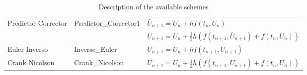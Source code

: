 \begin{table}[H]
\begin{center}
\begin{spacing}{1.5}
\begin{tabular}{| l | l | l |}
				Predictor Corrector & Predictor\_Corrector1  & $ \bar{U}_{n+1}=U_{n}+hf(t_{n},U_{n}) $ \\
				& & $ U_{n+1}=U_{n}+\frac{1}{2}h(f(t_{n+1},\bar{U}_{n+1})+f(t_{n},U_{n} )) $\\ \hline
				
				Euler Inverso & Inverse\_Euler & $ U_{n+1}=U_{n}+hf(t_{n+1},U_{n+1}) $\\ \hline
				
				Crank Nicolson & Crank\_Nicolson  & $  U_{n+1} = U_{n}+\frac{1}{2} h( f(t_{n+1}, U_{n+1})+f(t_{n},U_{n})) $ \\ \hline
			\end{tabular}
		\end{spacing}
	\end{center}
	\caption{Description of the available schemes }
\end{table}


